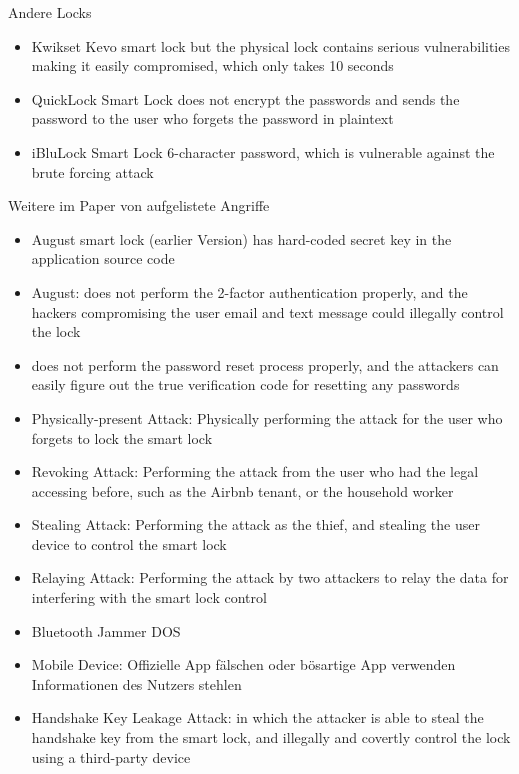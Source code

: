 	Andere Locks
	\begin{itemize}
		\item Kwikset Kevo smart lock but the physical lock contains serious vulnerabilities making it easily compromised, which only takes 10 seconds\cite{Ye2017}
		\item QuickLock Smart Lock does not encrypt the passwords and sends the password to the user who forgets the password in plaintext\cite{Ye2017}
		\item iBluLock Smart Lock 6-character password, which is vulnerable against the brute forcing attack\cite{Ye2017}
	\end{itemize}
	
	Weitere im Paper von \citeauthor{Ye2017} aufgelistete Angriffe
	\begin{itemize}
	    \item August smart lock (earlier Version) has hard-coded secret key in the application source code \cite{Rose2016}
		\item August: does not perform the 2-factor authentication properly, and the hackers compromising the user email and text message could illegally control the lock
		\item does not perform the password reset process properly, and the	attackers can easily figure out the true verification code for resetting any passwords
		\item Physically-present Attack: Physically performing the attack for the user	who forgets to lock the smart lock
		\item Revoking Attack: Performing the attack from the user who had the legal accessing before, such as the Airbnb tenant, or the household worker
		\item Stealing Attack: Performing the attack as the thief, and stealing the user device to control the smart lock
		\item Relaying Attack: Performing the attack by two attackers to relay the data for interfering with the smart lock control
		\item Bluetooth Jammer \textrightarrow DOS
		\item Mobile Device: Offizielle App fälschen oder bösartige App verwenden \textrightarrow Informationen des Nutzers stehlen \textrightarrow 
		\item Handshake Key Leakage Attack: in which the attacker is able to steal the handshake key from the smart lock, and	illegally and covertly control the lock using a third-party	device\\

\end{itemize}
